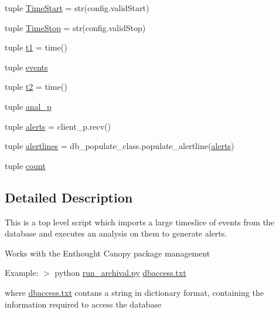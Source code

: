 \begin{DoxyCompactItemize}
\item 
tuple \hyperlink{namespacerun__archival_a53d4e2d27208c61f6d716aabecf14cb9}{Time\-Start} = str(config.\-valid\-Start)
\item 
tuple \hyperlink{namespacerun__archival_adac2aadd91ae98a0f37065bf28c01999}{Time\-Stop} = str(config.\-valid\-Stop)
\item 
tuple \hyperlink{namespacerun__archival_ae4106daf64be22b10853a0d056069368}{t1} = time()
\item 
tuple \hyperlink{namespacerun__archival_a46a929fd7b61c93a6bf4aa010103b238}{events}
\item 
tuple \hyperlink{namespacerun__archival_a2179a933281124091cdc32bed8a04c7f}{t2} = time()
\item 
tuple \hyperlink{namespacerun__archival_ae9e6113a713c17cde32e43834a99436a}{anal\-\_\-p}
\item 
tuple \hyperlink{namespacerun__archival_af84da43386d4cf1664600fe963e0cc67}{alerts} = client\-\_\-p.\-recv()
\item 
tuple \hyperlink{namespacerun__archival_a589caa564ea001aef6438ad3603fb021}{alertlines} = db\-\_\-populate\-\_\-class.\-populate\-\_\-alertline(\hyperlink{namespacerun__archival_af84da43386d4cf1664600fe963e0cc67}{alerts})
\item 
tuple \hyperlink{namespacerun__archival_ab4dad5a97c86185353fedf0feefa562e}{count}
\end{DoxyCompactItemize}


\subsection{Detailed Description}
\begin{DoxyVerb} This is a top level script which imports
 a large timeslice of events from the database and
 executes an analysis on them to generate alerts.\end{DoxyVerb}
 Works with the Enthought Canopy package management

Example\-: $>$ python \hyperlink{run__archival_8py}{run\-\_\-archival.\-py} \hyperlink{dbaccess_8txt}{dbaccess.\-txt}

where \hyperlink{dbaccess_8txt}{dbaccess.\-txt} contans a string in dictionary format, containing the information required to access the database 

